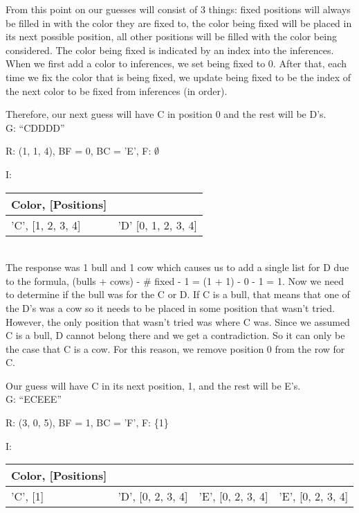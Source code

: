 \documentclass[11pt]{article}
\begin{document}
    From this point on our guesses will consist of 3 things: fixed positions will always be filled in with the color they are fixed to, the color being fixed will be placed in its next possible position, all other positions will be filled with the color being considered. The color being fixed is indicated by an index into the inferences. When we first add a color to inferences, we set being fixed to 0. After that, each time we fix the color that is being fixed, we update being fixed to be the index of the next color to be fixed from inferences (in order).

    Therefore, our next guess will have C in position 0 and the rest will be D's.\\

    \noindent G: \enquote{CDDDD}

    \noindent R: (1, 1, 4), BF = 0, BC = 'E', F: $\emptyset$

    \noindent I: \begin{tabularx}{.4\textwidth}{|X|X|}
        \hline
        Color, [Positions]&\\\hline 
        'C', [1, 2, 3, 4] &'D'  [0, 1, 2, 3, 4]\\\hline
    \end{tabularx}\\
    
    The response was 1 bull and 1 cow which causes us to add a single list for D due to the formula, (bulls + cows) - \# fixed - 1 = (1 + 1) - 0 - 1 = 1. Now we need to determine if the bull was for the C or D. If C is a bull, that means that one of the D's was a cow so it needs to be placed in some position that wasn't tried. However, the only position that wasn't tried was where C was. Since we assumed C is a bull, D cannot belong there and we get a contradiction. So it can only be the case that C is a cow. For this reason, we remove position 0 from the row for C.

    Our guess will have C in its next position, 1, and the rest will be E's.\\

    \noindent G: \enquote{ECEEE}

    \noindent R: (3, 0, 5), BF = 1, BC = 'F', F: \{1\}

    \noindent I: \begin{tabularx}{.85\textwidth}{|X|X|X|X|}
        \hline
        Color, [Positions]&&&\\\hline 
        'C', [1]&'D', [0, 2, 3, 4]&'E', [0, 2, 3, 4]&'E', [0, 2, 3, 4]\\\hline
    \end{tabularx}\\
    
\end{document}
